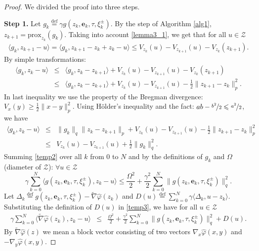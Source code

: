 \documentclass[runningheads]{llncs}
\def\eqdef{\overset{\text{def}}{=}}
\begin{document}
\begin{proof} We divided the proof into three steps.

\textbf{Step 1.} Let $g_k \eqdef \gamma g(z_k, \mathbf{e}_k, \tau,  \xi^{\pm}_k)$. By the step of Algorithm \ref{alg1}, $z_{k + 1}= \text{prox}_{z_k}(g_k)$. Taking into account \eqref{lemma3_1}, we get that for all $u \in \mathcal{Z}$
\begin{eqnarray*}
    \langle g_k , z_{k+1} - u\rangle = \langle g_k , z_{k+1} - z_{k} + z_{k} - u\rangle \leq V_{z_k}(u) - V_{z_{k + 1}}(u) - V_{z_k}(z_{k + 1}).
\end{eqnarray*}
By simple transformations:
\begin{eqnarray*}
    \langle g_k , z_{k} - u\rangle &\leq& \langle g_k , z_{k} - z_{k+1}\rangle + V_{z_k}(u) - V_{z_{k + 1}}(u) - V_{z_k}(z_{k + 1}) \nonumber\\
    &\leq& \langle g_k , z_{k} - z_{k+1}\rangle + V_{z_k}(u) - V_{z_{k + 1}}(u) - \frac{1}{2}\|z_{k + 1} - z_{k}\|^2_p. 
\end{eqnarray*}
In last inequality we use the property of the Bregman divergence: $V_x(y) \ge \frac{1}{2}\|x-y\|_p^2$.
Using Hölder's inequality and the fact: $ab - \nicefrac{b^2}{2} \leqslant\nicefrac{a^2}{2}$, we have
\begin{eqnarray}
    \label{temp2}
    \langle g_k , z_{k} - u\rangle &\leq&
    \| g_k \|_q\|z_{k} - z_{k+1}\|_p  + V_{z_k}(u) - V_{z_{k + 1}}(u) - \frac{1}{2}\|z_{k + 1} - z_{k}\|^2_p  \nonumber\\
    &\leq&
    V_{z_k}(u) - V_{z_{k + 1}}(u) + \frac{1}{2}\| g_k \|^2_q.
\end{eqnarray}
Summing \eqref{temp2} over all $k$ from 0 to $N$ and by the definitions of $g_k$ and $\Omega$ (diameter of $\mathcal{Z}$): $\forall u \in \mathcal{Z}$
\begin{equation}
    \label{temp3}
    \gamma \sum^N_{k = 0}  \langle g(z_k, \mathbf{e}_k, \tau,  \xi^{\pm}_k) , z_{k} - u\rangle \leq\frac{\Omega^2}{2} + \frac{\gamma^2}{2}\sum^N_{k = 0}  \| g(z_k, \mathbf{e}_k, \tau,  \xi^{\pm}_k)\|^2_q.
\end{equation}
Let $\Delta_k \eqdef g(z_k, \mathbf{e}_k, \tau, \xi^{\pm}_k) -  \tilde\nabla \hat{\varphi}(z_k)$ and $D(u) \eqdef \sum^N_{k = 0} \gamma \langle \Delta_k  ,u - z_{k}\rangle$. Substituting the definition of $D(u)$ in \eqref{temp3}, we have for all $u \in \mathcal{Z}$
\begin{eqnarray}
    \label{temp_main}
    \gamma \sum^N_{k = 0}  \langle \tilde\nabla \hat{\varphi}(z_k) , z_{k} - u\rangle &\leq&\frac{\Omega^2}{2} + \frac{\gamma^2}{2}\sum^N_{k = 0}  \| g(z_k, \mathbf{e}_k, \tau,  \xi^{\pm}_k) \|^2_q +  D(u) .
\end{eqnarray}
By $\tilde \nabla \hat{\varphi}(z)$ we mean a block vector consisting of two vectors $\nabla_x \hat{\varphi}(x,y)$ and $-\nabla_y \hat{\varphi}(x,y)$.


\end{proof}
\end{document}
